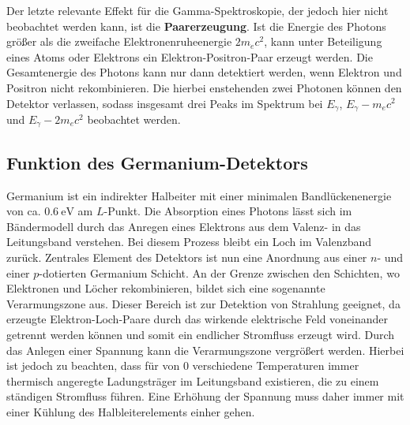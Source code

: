 Der letzte relevante Effekt für die Gamma-Spektroskopie, der jedoch hier nicht beobachtet werden kann, ist die 
\textbf{Paarerzeugung}. Ist die Energie des Photons größer als die zweifache Elektronenruheenergie $2m_ec^2$, 
kann unter Beteiligung eines Atoms oder Elektrons ein Elektron-Positron-Paar erzeugt werden. Die Gesamtenergie 
des Photons kann nur dann detektiert werden, wenn Elektron und Positron nicht rekombinieren. Die hierbei enstehenden 
zwei Photonen können den Detektor verlassen, sodass insgesamt drei Peaks im Spektrum bei $E_\gamma$, $E_\gamma - m_ec^2$ und 
$E_\gamma - 2m_ec^2$ beobachtet werden. 

\subsection{Funktion des Germanium-Detektors}
Germanium ist ein indirekter Halbeiter mit einer minimalen Bandlückenenergie von ca. $\SI{0.6}{\electronvolt}$ am $L$-Punkt. 
Die Absorption eines Photons lässt sich im Bändermodell durch das Anregen eines Elektrons aus dem Valenz- in das 
Leitungsband verstehen. Bei diesem Prozess bleibt ein Loch im Valenzband zurück. Zentrales Element des Detektors ist nun 
eine Anordnung aus einer $n$- und einer $p$-dotierten Germanium Schicht. An der Grenze zwischen den Schichten, wo Elektronen 
und Löcher rekombinieren, bildet sich eine sogenannte Verarmungszone aus. Dieser Bereich ist zur Detektion von Strahlung 
geeignet, da erzeugte Elektron-Loch-Paare durch das wirkende elektrische Feld voneinander getrennt werden können und somit ein 
endlicher Stromfluss erzeugt wird. Durch das Anlegen einer Spannung kann die Verarmungszone vergrößert werden. Hierbei ist jedoch 
zu beachten, dass für von $0$ verschiedene Temperaturen immer thermisch angeregte Ladungsträger im Leitungsband existieren, die 
zu einem ständigen Stromfluss führen. Eine Erhöhung der Spannung muss daher immer mit einer Kühlung des 
Halbleiterelements einher gehen.

